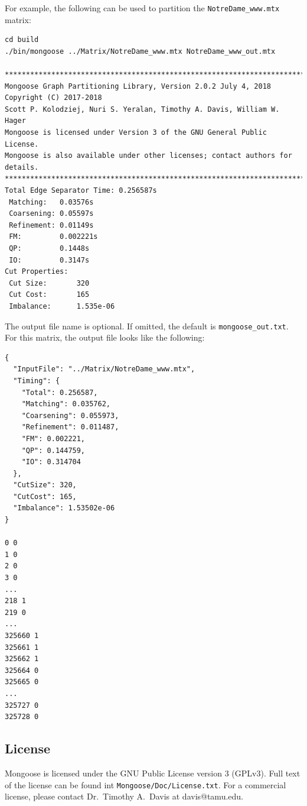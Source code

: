 \documentclass[letter]{article}
\begin{document}
For example, the following can be used to partition the \texttt{NotreDame\_www.mtx} matrix:

\begin{lstlisting}[numbers=none,xleftmargin=.09\textwidth, xrightmargin=.09\textwidth,keywordstyle=\color{black}]
cd build
./bin/mongoose ../Matrix/NotreDame_www.mtx NotreDame_www_out.mtx

********************************************************************************
Mongoose Graph Partitioning Library, Version 2.0.2 July 4, 2018
Copyright (C) 2017-2018
Scott P. Kolodziej, Nuri S. Yeralan, Timothy A. Davis, William W. Hager
Mongoose is licensed under Version 3 of the GNU General Public License.
Mongoose is also available under other licenses; contact authors for details.
********************************************************************************
Total Edge Separator Time: 0.256587s
 Matching:   0.03576s
 Coarsening: 0.05597s
 Refinement: 0.01149s
 FM:         0.002221s
 QP:         0.1448s
 IO:         0.3147s
Cut Properties:
 Cut Size:       320
 Cut Cost:       165
 Imbalance:      1.535e-06
\end{lstlisting}

The output file name is optional. If omitted, the default is \texttt{mongoose\_out.txt}.
For this matrix, the output file looks like the following:

\begin{lstlisting}[numbers=none,xleftmargin=.09\textwidth, xrightmargin=.09\textwidth,keywordstyle=\color{black}]
{
  "InputFile": "../Matrix/NotreDame_www.mtx",
  "Timing": {
    "Total": 0.256587,
    "Matching": 0.035762,
    "Coarsening": 0.055973,
    "Refinement": 0.011487,
    "FM": 0.002221,
    "QP": 0.144759,
    "IO": 0.314704
  },
  "CutSize": 320,
  "CutCost": 165,
  "Imbalance": 1.53502e-06
}

0 0
1 0
2 0
3 0
...
218 1
219 0
...
325660 1
325661 1
325662 1
325664 0
325665 0
...
325727 0
325728 0

\end{lstlisting}

\subsection{License}

Mongoose is licensed under the GNU Public License version 3 (GPLv3). Full text of the license can be found int \texttt{Mongoose/Doc/License.txt}. For a commercial license, please contact Dr.~Timothy A.~Davis at davis@tamu.edu.
\end{document}
